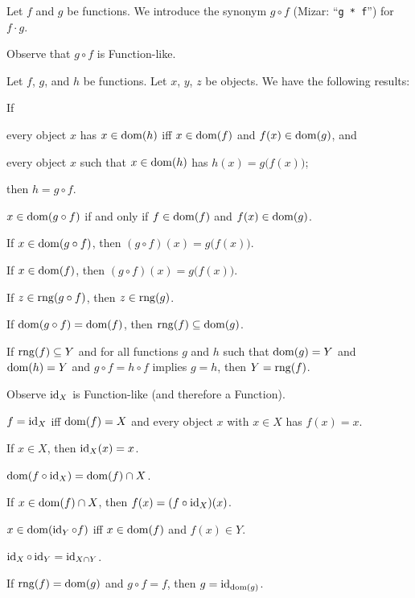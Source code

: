 \documentclass{article}
\begin{document}
\begin{notation}\hypertarget{notation:funct1:composition}{}
Let $f$ and $g$ be functions. We introduce the synonym $g\circ f$
(Mizar: ``\verb#g * f#'') for $f\cdot g$.
\end{notation}

Observe that $g\circ f$ is Function-like.

Let $f$, $g$, and $h$ be functions. Let $x$, $y$, $z$ be objects. We have the following results:
\begin{thm}
\item\label{funct1:10} If \begin{enumerate*}[label=(\roman*)] 
\item every object $x$ has $x\in\operatorname{dom}(h)$ iff $x\in\operatorname{dom}(f)$ and $f(x)\in\operatorname{dom}(g)$,
and
\item every object $x$ such that $x\in\operatorname{dom}(h)$ has $h(x)=g\bigl(f(x)\bigr)$;
\end{enumerate*}
  then $h=g\circ f$.
\item\label{funct1:11} $x\in\operatorname{dom}(g\circ f)$ if and only if $f\in\operatorname{dom}(f)$
  and $f(x)\in\operatorname{dom}(g)$.
\item\label{funct1:12} If $x\in\operatorname{dom}(g\circ f)$, then $(g\circ f)(x)=g\bigl(f(x)\bigr)$.
\item\label{funct1:13} If $x\in\operatorname{dom}(f)$, then $(g\circ f)(x)=g\bigl(f(x)\bigr)$.
\item\label{funct1:14} If $z\in\operatorname{rng}(g\circ f)$, then $z\in\operatorname{rng}(g)$.
\item\label{funct1:15} If $\operatorname{dom}(g\circ f)=\operatorname{dom}(f)$, then $\operatorname{rng}(f)\subseteq\operatorname{dom}(g)$.
\item\label{funct1:16} If $\operatorname{rng}(f)\subseteq Y$
  and for all functions $g$ and $h$ such that $\operatorname{dom}(g)=Y$ and
  $\operatorname{dom}(h)=Y$ and $g\circ f=h\circ f$ implies $g=h$,
  then $Y=\operatorname{rng}(f)$.
\end{thm}

Observe $\operatorname{id}_{X}$ is Function-like (and therefore a Function).

\begin{thm}
\item\label{funct1:17} $f=\operatorname{id}_{X}$ iff $\operatorname{dom}(f)=X$ and every object $x$
  with $x\in X$ has $f(x)=x$.
\item\label{funct1:18} If $x\in X$, then $\operatorname{id}_{X}(x)=x$.
\item\label{funct1:19} $\operatorname{dom}(f\circ\operatorname{id}_{X})=\operatorname{dom}(f)\cap X$.
\item\label{funct1:20} If $x\in\operatorname{dom}(f)\cap X$, then $f(x)=(f\circ\operatorname{id}_{X})(x)$.
\item\label{funct1:21} $x\in\operatorname{dom}(\operatorname{id}_{Y}\circ f)$ iff $x\in\operatorname{dom}(f)$ and
  $f(x)\in Y$.
\item\label{funct1:22} $\operatorname{id}_{X}\circ\operatorname{id}_{Y}=\operatorname{id}_{X\cap Y}$.
\item\label{funct1:23} If $\operatorname{rng}(f)=\operatorname{dom}(g)$ and $g\circ f=f$, then $g=\operatorname{id}_{\operatorname{dom}(g)}$.
\end{thm}
\end{document}

